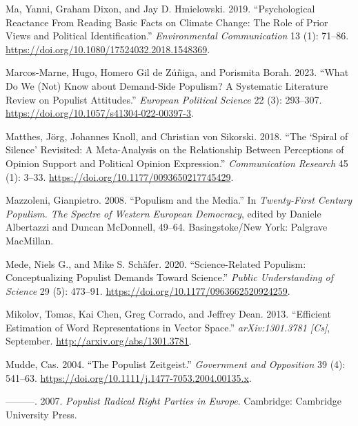 \documentclass[
]{ccr}
\newlength{\cslhangindent}
\newlength{\cslentryspacingunit} %
\newenvironment{CSLReferences}[2] %
 {%
  \setlength{\parindent}{0pt}
  \ifodd #1
  \let\oldpar\par
  \def\par{\hangindent=\cslhangindent\oldpar}
  \fi
  \setlength{\parskip}{#2\cslentryspacingunit}
 }%
 {}
\begin{document}
\begin{CSLReferences}{1}{0}
\leavevmode{}%
Ma, Yanni, Graham Dixon, and Jay D. Hmielowski. 2019. {``Psychological
{Reactance From Reading Basic Facts} on {Climate Change}: {The Role} of
{Prior Views} and {Political Identification}.''} \emph{Environmental
Communication} 13 (1): 71--86.
\url{https://doi.org/10.1080/17524032.2018.1548369}.

\leavevmode{}%
Marcos-Marne, Hugo, Homero Gil de Zúñiga, and Porismita Borah. 2023.
{``What Do We (Not) Know about Demand-Side Populism? {A} Systematic
Literature Review on Populist Attitudes.''} \emph{European Political
Science} 22 (3): 293--307.
\url{https://doi.org/10.1057/s41304-022-00397-3}.

\leavevmode{}%
Matthes, Jörg, Johannes Knoll, and Christian von Sikorski. 2018. {``The
{`{Spiral} of {Silence}'} {Revisited}: {A Meta-Analysis} on the
{Relationship Between Perceptions} of {Opinion Support} and {Political
Opinion Expression}.''} \emph{Communication Research} 45 (1): 3--33.
\url{https://doi.org/10.1177/0093650217745429}.

\leavevmode{}%
Mazzoleni, Gianpietro. 2008. {``Populism and the Media.''} In
\emph{Twenty-First Century Populism. {The} Spectre of {Western European}
Democracy}, edited by Daniele Albertazzi and Duncan McDonnell, 49--64.
{Basingstoke/New York}: {Palgrave MacMillan}.

\leavevmode{}%
Mede, Niels G., and Mike S. Schäfer. 2020. {``Science-Related Populism:
{Conceptualizing} Populist Demands Toward Science.''} \emph{Public
Understanding of Science} 29 (5): 473--91.
\url{https://doi.org/10.1177/0963662520924259}.

\leavevmode{}%
Mikolov, Tomas, Kai Chen, Greg Corrado, and Jeffrey Dean. 2013.
{``Efficient {Estimation} of {Word Representations} in {Vector
Space}.''} \emph{arXiv:1301.3781 {[}Cs{]}}, September.
\url{http://arxiv.org/abs/1301.3781}.

\leavevmode{}%
Mudde, Cas. 2004. {``The Populist Zeitgeist.''} \emph{Government and
Opposition} 39 (4): 541--63.
\url{https://doi.org/10.1111/j.1477-7053.2004.00135.x}.

\leavevmode{}%
---------. 2007. \emph{Populist Radical Right Parties in {Europe}}.
{Cambridge}: {Cambridge University Press}.


\end{CSLReferences}
\end{document}
